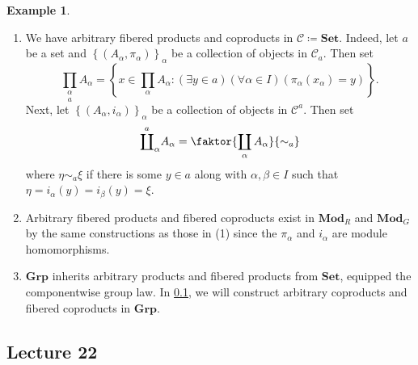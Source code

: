 \documentclass[10pt,letterpaper,cm]{nupset}
\theoremstyle{definition}
\newtheorem{exmp}[definition]{Example}
\theoremstyle{theorem}
\theoremstyle{remark}
\newcommand{\1}{\mathbf{1}}
\renewcommand{\c}{\mathscr{C}}
\newcommand{\0}{\vec 0}
\begin{document}
\begin{exmp}\label{ex32} $ $
\begin{enumerate}[label=(\arabic*)]
\item We have arbitrary fibered products and coproducts in $\c\coloneqq  \mathbf{Set}$. Indeed, let $a$ be a set and $\left\{(A_{\alpha}, \pi_{\alpha})\right\}_{\alpha}$ be a collection of objects in $\c_a$. Then set $$\underset{a}{\prod_{\alpha}} A_{\alpha} = \left\{x \in \prod_{\alpha} A_{\alpha} :  (\exists y \in a)(\forall \alpha \in I)(\pi_{\alpha}(x_{\alpha}) = y)\right\}.$$ Next, let $\left\{(A_{\alpha}, i_{\alpha})\right\}_{\alpha}$ be a collection of objects in $\c^a$. Then set $$ 
\overset{a}{\coprod}_{\alpha}A_{\alpha} = \faktor{\coprod_{\alpha} A_{\alpha}}{\sim_a}$$ where $\eta \sim_a \xi$ if there is some $y \in a$ along with $\alpha, \beta \in I$ such that $\eta = i_{\alpha}(y) = i_{\beta}(y) = \xi$.
\item Arbitrary fibered products and fibered coproducts exist in $\mathbf{Mod}_R$ and $\mathbf{Mod}_G$ by the same constructions as those in (1) since the $\pi_{\alpha}$ and $i_{\alpha}$ are module homomorphisms.
\item $\mathbf{Grp}$ inherits arbitrary products and fibered products from $\mathbf{Set}$, equipped the componentwise group law. In \cref{L22}, we will construct arbitrary coproducts and fibered coproducts in $\mathbf{Grp}$. 
\end{enumerate}
\end{exmp}

\subsection{Lecture 22}\label{L22}
\end{document}
